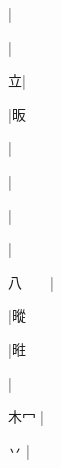 \begin{multicols}{2}
{{\cjk{}{\cnsym{}　}{\cnsym{}　}{\cnsym{}　}}|{}\par
{\cjk{}{\cnsym{}　}{\cnsym{}　}{\cnsym{}　}}|{}\par
{\cjk{}{\cnsym{}　}{\cnsym{}　}立}|{}\par
{\cjk{}{\cnsym{}　}{\cnsym{}　}{\cnsym{}　}}|{\cjk{}昄}\par
{}|{}\par
{\cjk{}{\cnsym{}　}{\cnsym{}　}{\cnsym{}　}}|{}\par
{\cjk{}{\cnsym{}　}{\cnsym{}　}{\cnsym{}　}}|{}\par
{\cjk{}{\cnsym{}　}{\cnsym{}　}{\cnsym{}　}}|{}\par
{\cjk{}八{\cnsym{}　}{\cnsym{}　}}|{}\par
{\cjk{}{\cnsym{}　}{\cnsym{}　}{\cnsym{}　}}|{\cjk{}暰}\par
{\cjk{}{\cnsym{}　}{\cnsym{}　}{\cnsym{}　}}|{\cjk{}暀}\par
{\cjk{}{\cnsym{}　}{\cnsym{}　}{\cnsym{}　}}|{}\par
{\cjk{}木{\cnxHanaA{}冖}{\cnxJzr{}}}|{}\par
{\cjk{}{\cnsym{}　}丷{\cnjzr{}}}|{}\par
}
\end{multicols}
